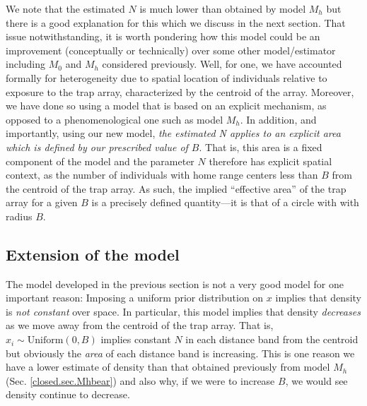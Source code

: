 We note that the estimated $N$ is much lower than obtained by model
$M_h$ but there is a good explanation for this which we discuss in the
next section.  That issue notwithstanding, it is worth pondering how
this model could be an improvement (conceptually or technically) over
some other model/estimator including $M_0$ and $M_h$ considered
previously. Well, for one, we have accounted formally for
heterogeneity due to spatial location of individuals relative to
exposure to the trap array, characterized by the centroid of the
array. Moreover, we have done so using a model that is based on an
explicit mechanism, as opposed to a phenomenological one such as model
$M_h$. In addition, and importantly, using our new model, {\it the
  estimated N applies to an explicit area which is defined by our
  prescribed value of $B$}. That is, this area is a fixed component of
the model and the parameter $N$ therefore has explicit spatial
context, as the number of individuals with home range centers less
than $B$ from the centroid of the trap array. As such, the implied
``effective area'' of the trap array for a given $B$ is a precisely
defined quantity---it is that of a circle with with radius $B$.


\subsection{Extension of the model}

The model developed in the previous section is not a very good model
for one important reason: Imposing a uniform prior distribution on $x$
implies that density is {\it not constant} over space. In particular,
this model implies that density {\it decreases} as we move away from
the centroid of the trap array.  That is, $x_{i} \sim
\mbox{Uniform}(0,B)$ implies constant $N$ in each distance band from
the centroid but obviously the {\it area} of each distance band is
increasing.  This is one reason we have a lower estimate of density
than that obtained previously from model $M_h$
(Sec. \ref{closed.sec.Mhbear}) and also why, if we were to increase
$B$, we would see density continue to decrease.

